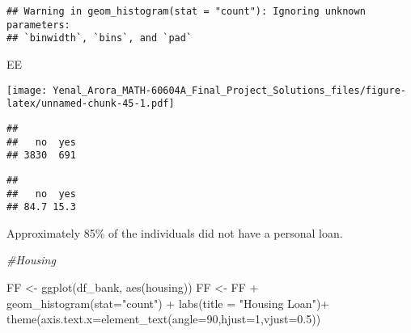 \documentclass[
]{article}
\newenvironment{Shaded}{\begin{snugshade}}{\end{snugshade}}
\newcommand{\AttributeTok}[1]{\textcolor[rgb]{0.77,0.63,0.00}{#1}}
\newcommand{\CommentTok}[1]{\textcolor[rgb]{0.56,0.35,0.01}{\textit{#1}}}
\newcommand{\DecValTok}[1]{\textcolor[rgb]{0.00,0.00,0.81}{#1}}
\newcommand{\FloatTok}[1]{\textcolor[rgb]{0.00,0.00,0.81}{#1}}
\newcommand{\FunctionTok}[1]{\textcolor[rgb]{0.00,0.00,0.00}{#1}}
\newcommand{\NormalTok}[1]{#1}
\newcommand{\OtherTok}[1]{\textcolor[rgb]{0.56,0.35,0.01}{#1}}
\newcommand{\SpecialCharTok}[1]{\textcolor[rgb]{0.00,0.00,0.00}{#1}}
\newcommand{\StringTok}[1]{\textcolor[rgb]{0.31,0.60,0.02}{#1}}
\begin{document}
\begin{verbatim}
## Warning in geom_histogram(stat = "count"): Ignoring unknown parameters:
## `binwidth`, `bins`, and `pad`
\end{verbatim}

\begin{Shaded}
\begin{Highlighting}[]
\NormalTok{EE}
\end{Highlighting}
\end{Shaded}

\texttt{[image: Yenal\_Arora\_MATH-60604A\_Final\_Project\_Solutions\_files/figure-latex/unnamed-chunk-45-1.pdf]}

\begin{Shaded}
\end{Shaded}

\begin{verbatim}
## 
##   no  yes 
## 3830  691
\end{verbatim}

\begin{Shaded}
\end{Shaded}

\begin{verbatim}
## 
##   no  yes 
## 84.7 15.3
\end{verbatim}

Approximately 85\% of the individuals did not have a personal loan.

\begin{Shaded}
\begin{Highlighting}[]
\CommentTok{\#Housing}

\NormalTok{FF }\OtherTok{\textless{}{-}} \FunctionTok{ggplot}\NormalTok{(df\_bank, }\FunctionTok{aes}\NormalTok{(housing))}
\NormalTok{FF }\OtherTok{\textless{}{-}}\NormalTok{ FF }\SpecialCharTok{+} \FunctionTok{geom\_histogram}\NormalTok{(}\AttributeTok{stat=}\StringTok{"count"}\NormalTok{) }\SpecialCharTok{+} \FunctionTok{labs}\NormalTok{(}\AttributeTok{title =} \StringTok{"Housing Loan"}\NormalTok{)}\SpecialCharTok{+}
  \FunctionTok{theme}\NormalTok{(}\AttributeTok{axis.text.x=}\FunctionTok{element\_text}\NormalTok{(}\AttributeTok{angle=}\DecValTok{90}\NormalTok{,}\AttributeTok{hjust=}\DecValTok{1}\NormalTok{,}\AttributeTok{vjust=}\FloatTok{0.5}\NormalTok{))}
\end{Highlighting}
\end{Shaded}
\end{document}
